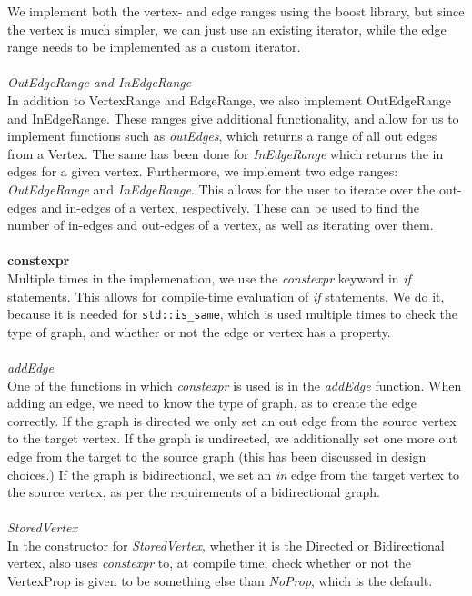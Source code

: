 \documentclass{article}
\begin{document}
We implement both the vertex- and edge ranges using the boost library, but since the vertex is much simpler, we can just use an existing iterator, while the edge range needs to be implemented as a custom iterator. 
\\\\
\textit{OutEdgeRange and InEdgeRange}\\
In addition to VertexRange and EdgeRange, we also implement OutEdgeRange and InEdgeRange. These ranges give additional functionality, and allow for us to implement functions such as \textit{outEdges}, which returns a range of all out edges from a Vertex. The same has been done for \textit{InEdgeRange} which returns the in edges for a given vertex. 
Furthermore, we implement two edge ranges: \textit{OutEdgeRange} and \textit{InEdgeRange}. This allows for the user to iterate over the out-edges and in-edges of a vertex, respectively. These can be used to find the number of in-edges and out-edges of a vertex, as well as iterating over them. 
\\\\
\noindent
\textbf{constexpr}\\
\noindent
Multiple times in the implemenation, we use the \textit{constexpr} keyword in \textit{if} statements. This allows for compile-time evaluation of \textit{if} statements. 
We do it, because it is needed for \texttt{std::is\_same}, which is used multiple times to check the type of graph, and whether or not the edge or vertex has a property. 
\\\\
\noindent
\textit{addEdge}\\
\noindent
One of the functions in which \textit{constexpr} is used is in the \textit{addEdge} function. 
When adding an edge, we need to know the type of graph, as to create the edge correctly. If the graph is directed we only set an out edge from the source vertex to the target vertex. If the graph is undirected, we additionally set one more out edge from the target to the source graph (this has been discussed in design choices.) If the graph is bidirectional, we set an \textit{in} edge from the target vertex to the source vertex, as per the requirements of a bidirectional graph.
\\\\
\noindent
\textit{StoredVertex}\\
\noindent
In the constructor for \textit{StoredVertex}, whether it is the Directed or Bidirectional vertex, also uses \textit{constexpr} to, at compile time, check whether or not the VertexProp is given to be something else than \textit{NoProp}, which is the default. 
\end{document}
